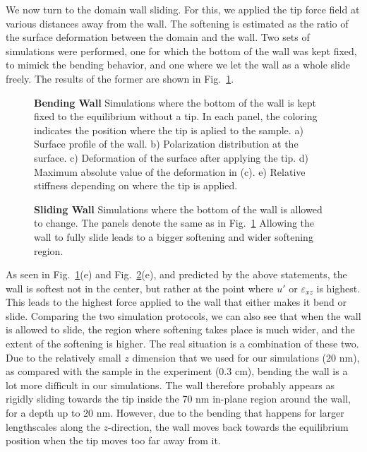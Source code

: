We now turn to the domain wall sliding.
For this, we applied the tip force field at various distances away from the wall.
The softening is estimated as the ratio of the surface deformation between the domain and the wall.
Two sets of simulations were performed, one for which the bottom of the wall was kept fixed, to mimick the bending behavior, and one where we let the wall as a whole slide freely.
The results of the former are shown in Fig.~\ref{fig:BTO_bending_sim}.
\begin{figure}[h!]
	\caption{\label{fig:BTO_bending_sim}{\bf Bending Wall} Simulations where the bottom of the wall is kept fixed to the equilibrium without a tip. In each panel, the coloring indicates the position where the tip is aplied to the sample. a) Surface profile of the wall. b) Polarization distribution at the surface. c) Deformation of the surface after applying the tip. d) Maximum absolute value of the deformation in (c). e) Relative stiffness depending on where the tip is applied.}
\end{figure}
\begin{figure}[h!]
	\caption{\label{fig:BTO_sliding_sim}{\bf Sliding Wall} Simulations where the bottom of the wall is allowed to change. The panels denote the same as in Fig.~\ref{fig:BTO_bending_sim} Allowing the wall to fully slide leads to a bigger softening and wider softening region.}
\end{figure}
As seen in Fig.~\ref{fig:BTO_bending_sim}(e) and Fig.~\ref{fig:BTO_sliding_sim}(e), and predicted by the above statements, the wall is softest not in the center, but rather at the point where $u'$ or $\varepsilon_{xz}$ is highest.
This leads to the highest force applied to the wall that either makes it bend or slide.
Comparing the two simulation protocols, we can also see that when the wall is allowed to slide, the region where softening takes place is much wider, and the extent of the softening is higher.
The real situation is a combination of these two. Due to the relatively small $z$ dimension that we used for our simulations (20 nm), as compared with the sample in the experiment (0.3 cm), bending the wall is a lot more difficult in our simulations.
The wall therefore probably appears as rigidly sliding towards the tip inside the 70 nm in-plane region around the wall, for a depth up to 20 nm.
However, due to the bending that happens for larger lengthscales along the $z$-direction, the wall moves back towards the equilibrium position when the tip moves too far away from it.

